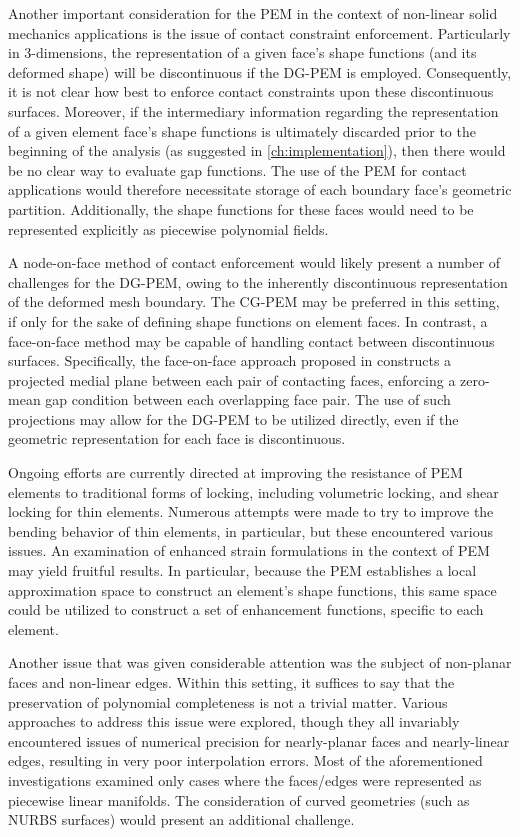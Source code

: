 Another important consideration for the PEM in the context of non-linear solid mechanics applications is the issue of contact constraint enforcement. Particularly in 3-dimensions, the representation of a given face's shape functions (and its deformed shape) will be discontinuous if the DG-PEM is employed. Consequently, it is not clear how best to enforce contact constraints upon these discontinuous surfaces. Moreover, if the intermediary information regarding the representation of a given element face's shape functions is ultimately discarded prior to the beginning of the analysis (as suggested in \ref{ch:implementation}), then there would be no clear way to evaluate gap functions. The use of the PEM for contact applications would therefore necessitate storage of each boundary face's geometric partition. Additionally, the shape functions for these faces would need to be represented explicitly as piecewise polynomial fields.

A node-on-face method of contact enforcement would likely present a number of challenges for the DG-PEM, owing to the inherently discontinuous representation of the deformed mesh boundary. The CG-PEM may be preferred in this setting, if only for the sake of defining shape functions on element faces. In contrast, a face-on-face method may be capable of handling contact between discontinuous surfaces. Specifically, the face-on-face approach proposed in \cite{Wopschall:17} constructs a projected medial plane between each pair of contacting faces, enforcing a zero-mean gap condition between each overlapping face pair. The use of such projections may allow for the DG-PEM to be utilized directly, even if the geometric representation for each face is discontinuous.

Ongoing efforts are currently directed at improving the resistance of PEM elements to traditional forms of locking, including volumetric locking, and shear locking for thin elements. Numerous attempts were made to try to improve the bending behavior of thin elements, in particular, but these encountered various issues. An examination of enhanced strain formulations in the context of PEM may yield fruitful results. In particular, because the PEM establishes a local approximation space to construct an element's shape functions, this same space could be utilized to construct a set of enhancement functions, specific to each element.

Another issue that was given considerable attention was the subject of non-planar faces and non-linear edges. Within this setting, it suffices to say that the preservation of polynomial completeness is not a trivial matter. Various approaches to address this issue were explored, though they all invariably encountered issues of numerical precision for nearly-planar faces and nearly-linear edges, resulting in very poor interpolation errors. Most of the aforementioned investigations examined only cases where the faces/edges were represented as piecewise linear manifolds. The consideration of curved geometries (such as NURBS surfaces) would present an additional challenge.


